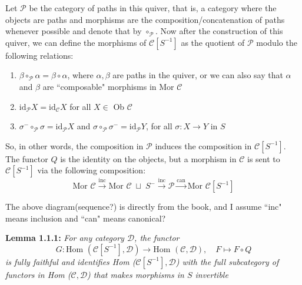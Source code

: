 \documentclass[12pt]{article}
\newcommand{\cat}[1]{\mathscr{#1}}
\begin{document}
 Let $\mathcal{P}$ be the category of paths in this quiver, that is, a category where the objects are paths and morphisms are the composition/concatenation of paths whenever possible and denote that by $\circ_{\mathcal{P}}$. Now after the construction of this quiver, we can define the morphisms of $\cat{C}[S^{-1}]$ as the quotient of $\mathcal{P}$ modulo the following relations:

 \begin{enumerate}
     \item $\beta \circ_{\mathcal{P}}\alpha=\beta \circ \alpha$, where $\alpha,\beta$ are paths in the quiver, or we can also say that $\alpha$ and $\beta$ are ``composable" morphisms in Mor $\cat{C}$
     \item $\text{id}_\mathcal{P}X=\text{id}_\cat{C}X$ for all $X \in$ Ob $\cat{C}$
     \item $\sigma^- \circ_\mathcal{P}\sigma=\text{id}_\mathcal{P}X$ and $\sigma \circ_\mathcal{P} \sigma^-=\text{id}_\mathcal{P}Y$, for all $\sigma:X \to Y$ in $S$
 \end{enumerate}

 So, in other words, the composition in $\mathcal{P}$ induces the composition in $\cat{C}[S^{-1}]$. The functor $Q$ is the identity on the objects, but a morphism in $\cat{C}$ is sent to $\cat{C}[S^{-1}]$ via the following composition:
 \[
 \text{Mor }\cat{C} \xrightarrow{\text{inc}} \text{Mor }\cat{C} \;\sqcup \; S^- \xrightarrow{\text{inc}} \mathcal{P} \xrightarrow{\text{can}} \text{Mor } \cat{C}[S^{-1}]
 \]

 The above diagram(sequence?) is directly from the book, and I assume ``inc" means inclusion and ``can" means canonical? 

 \textbf{Lemma 1.1.1: } \textit{For any category $\cat{D}$, the functor
 \[
 G: \text{Hom }(\cat{C}[S^{-1}],\cat{D}) \to \text{Hom }(\cat{C,D}), \quad F\mapsto F \circ Q
 \]
 is fully faithful and identifies Hom ($\cat{C}[S^{-1}],\cat{D}$) with the full subcategory of functors in Hom ($\cat{C,D}$) that makes morphisms in $S$ invertible}\\
\end{document}
